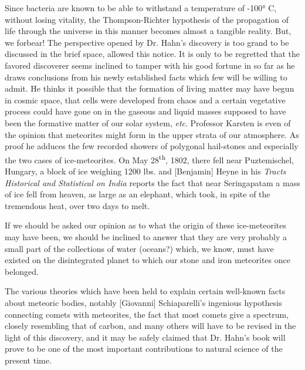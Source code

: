 \documentclass[a4paper, 12pt, oneside]{article}
\begin{document}
Since bacteria are known to be able to withstand a temperature of -100° C, without losing vitality, the Thompson-Richter hypothesis of the propagation of life through the universe in this manner becomes almost a tangible reality. But, we forbear! The perspective opened by Dr. Hahn's discovery is too grand to be discussed in the brief space, allowed this notice. It is only to be regretted that the favored discoverer seems inclined to tamper with his good fortune in so far as he draws conclusions from his newly established facts which few will be willing to admit. He thinks it possible that the formation of living matter may have begun in cosmic space, that cells were developed from chaos and a certain vegetative process could have gone on in the gaseous and liquid masses supposed to have been the formative matter of our solar system, \emph{etc}. Professor Karsten is even of the opinion that meteorites might form in the upper strata of our atmosphere. As proof he adduces the few recorded showers of polygonal hail-stones and especially the two cases of ice-meteorites. On May 28\textsuperscript{th}, 1802, there fell near Puztemischel, Hungary, a block of ice weighing 1200 lbs. and [Benjamin] Heyne in his \emph{Tracts Historical and Statistical on India} reports the fact that near Seringapatam a mass of ice fell from heaven, as large as an elephant, which took, in spite of the tremendous heat, over two days to melt.

If we should be asked our opinion as to what the origin of these ice-meteorites may have been, we should be inclined to answer that they are very probably a small part of the collections of water (oceans?) which, we know, must have existed on the disintegrated planet to which our stone and iron meteorites once belonged.

The various theories which have been held to explain certain well-known facts about meteoric bodies, notably [Giovanni] Schiaparelli's ingenious hypothesis connecting comets with meteorites, the fact that most comets give a spectrum, closely resembling that of carbon, and many others will have to be revised in the light of this discovery, and it may be safely claimed that Dr. Hahn's book will prove to be one of the most important contributions to natural science of the present time.
\clearpage
\subsection{}
\end{document}
